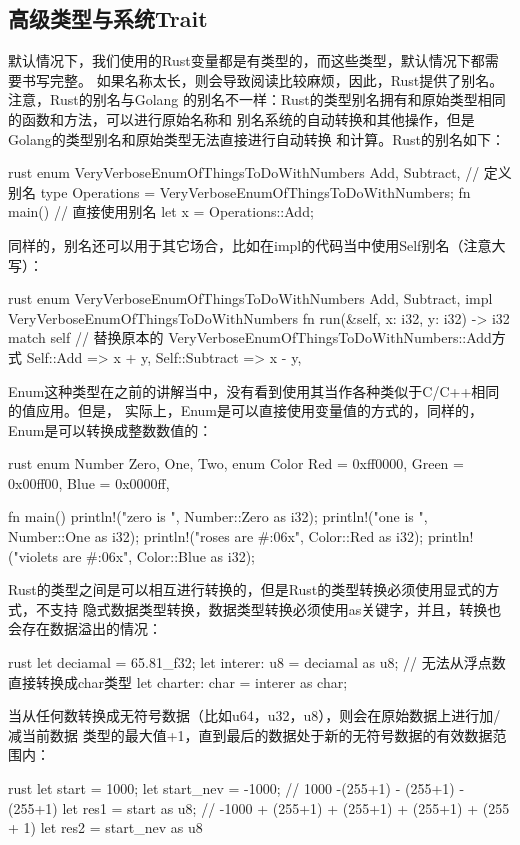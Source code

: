 \subsection{高级类型与系统Trait}
默认情况下，我们使用的Rust变量都是有类型的，而这些类型，默认情况下都需要书写完整。
如果名称太长，则会导致阅读比较麻烦，因此，Rust提供了别名。注意，Rust的别名与Golang
的别名不一样：Rust的类型别名拥有和原始类型相同的函数和方法，可以进行原始名称和
别名系统的自动转换和其他操作，但是Golang的类型别名和原始类型无法直接进行自动转换
和计算。Rust的别名如下：
\begin{code-block}{rust}
enum VeryVerboseEnumOfThingsToDoWithNumbers {
    Add,
    Subtract,
}
// 定义别名
type Operations = VeryVerboseEnumOfThingsToDoWithNumbers;
fn main() {
    // 直接使用别名
    let x = Operations::Add;
}
\end{code-block}
同样的，别名还可以用于其它场合，比如在impl的代码当中使用Self别名（注意大写）：
\begin{code-block}{rust}
enum VeryVerboseEnumOfThingsToDoWithNumbers {
    Add,
    Subtract,
}
impl VeryVerboseEnumOfThingsToDoWithNumbers {
    fn run(&self, x: i32, y: i32) -> i32 {
        match self {
            // 替换原本的 VeryVerboseEnumOfThingsToDoWithNumbers::Add方式
            Self::Add => x + y,
            Self::Subtract => x - y,
        }
    }
}
\end{code-block}

Enum这种类型在之前的讲解当中，没有看到使用其当作各种类似于C/C++相同的值应用。但是，
实际上，Enum是可以直接使用变量值的方式的，同样的，Enum是可以转换成整数数值的：
\begin{code-block}{rust}
enum Number {
    Zero,
    One,
    Two,
}
enum Color {
    Red = 0xff0000,
    Green = 0x00ff00,
    Blue = 0x0000ff,
}

fn main() {
    println!("zero is {}", Number::Zero as i32);
    println!("one is {}", Number::One as i32);
    println!("roses are #{:06x}", Color::Red as i32);
    println!("violets are #{:06x}", Color::Blue as i32);
}
\end{code-block}

Rust的类型之间是可以相互进行转换的，但是Rust的类型转换必须使用显式的方式，不支持
隐式数据类型转换，数据类型转换必须使用as关键字，并且，转换也会存在数据溢出的情况：
\begin{code-block}{rust}
let deciamal = 65.81_f32;
let interer: u8 = deciamal as u8;
// 无法从浮点数直接转换成char类型
let charter: char = interer as char;
\end{code-block}
当从任何数转换成无符号数据（比如u64，u32，u8），则会在原始数据上进行加/减当前数据
类型的最大值+1，直到最后的数据处于新的无符号数据的有效数据范围内：
\begin{code-block}{rust}
let start = 1000;
let start_nev = -1000;
// 1000 -(255+1) - (255+1) - (255+1)
let res1 = start as u8;
// -1000 + (255+1) + (255+1) + (255+1) + (255 + 1)
let res2 = start_nev as u8
\end{code-block}

